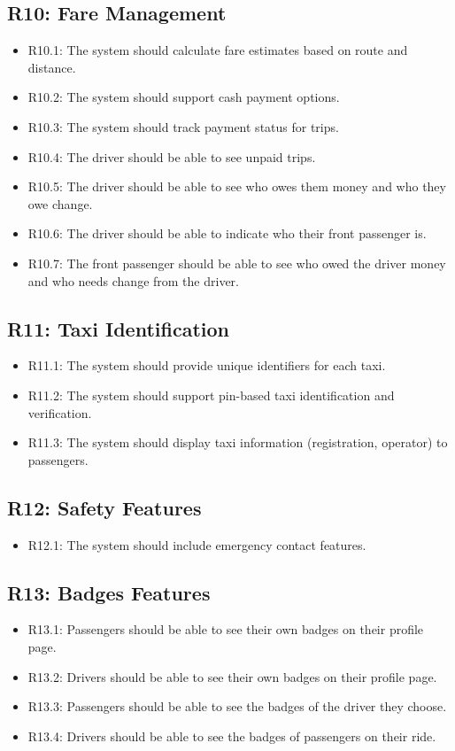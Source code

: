\documentclass[a4paper,12pt]{article}
\begin{document}
\subsection*{R10: Fare Management}
\begin{itemize}
    \item R10.1: The system should calculate fare estimates based on route and distance.
    \item R10.2: The system should support cash payment options.
    \item R10.3: The system should track payment status for trips.
    \item R10.4: The driver should be able to see unpaid trips.
    \item R10.5: The driver should be able to see who owes them money and who they owe change.
    \item R10.6: The driver should be able to indicate who their front passenger is.
    \item R10.7: The front passenger should be able to see who owed the driver money and who needs change from the driver.
\end{itemize}

\subsection*{R11: Taxi Identification}
\begin{itemize}
    \item R11.1: The system should provide unique identifiers for each taxi.
    \item R11.2: The system should support  pin-based taxi identification and verification.
    \item R11.3: The system should display taxi information (registration, operator) to passengers.
\end{itemize}

\subsection*{R12: Safety Features}
\begin{itemize}
    \item R12.1: The system should include emergency contact features.
\end{itemize}

\subsection*{R13: Badges Features}
\begin{itemize}
    \item R13.1: Passengers should be able to see their own badges on their profile page.
    \item R13.2: Drivers should be able to see their own badges on their profile page.
    \item R13.3: Passengers should be able to see the badges of the driver they choose.
    \item R13.4: Drivers should be able to see the badges of passengers on their ride.
\end{itemize}
\end{document}
